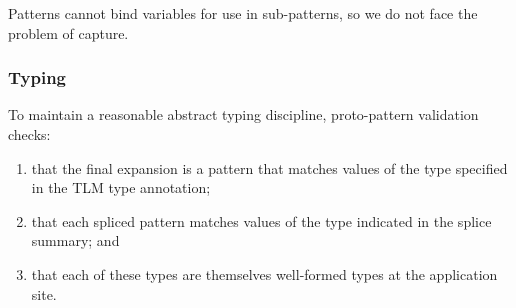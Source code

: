 \documentclass[acmsmall,10pt,review,anonymous]{acmart}\settopmatter{printfolios=true}
\begin{document}
Patterns cannot bind variables for use in sub-patterns, so we do not face the problem of capture. %

\subsubsection{Typing} To maintain a reasonable abstract typing discipline, proto-pattern validation checks:
\begin{enumerate}
  \item that the final expansion is a pattern that matches values of the type specified in the TLM type annotation;
  \item that each spliced pattern matches values of the type indicated in the splice summary; and 
  \item that each of these types are themselves well-formed types at the application site.
\end{enumerate}
\newcommand{\seTLMsFormallySec}{Simple TLMs, Formally}
\end{document}
